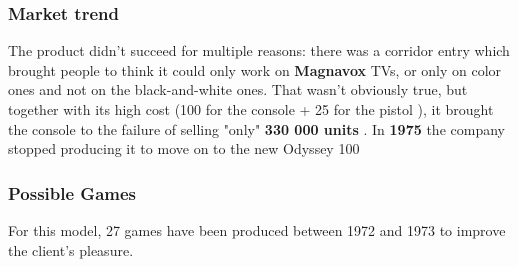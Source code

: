 \documentclass[a4paper,10pt]{book}
\begin{document}
 \subsubsection{Market trend }
 The product didn't succeed for multiple reasons: there was a corridor entry which brought people to think it could
          only work on  \textbf{Magnavox }  TVs, or only on color ones and not on the black-and-white ones.
          That wasn't obviously true, but together with its high cost (100  for the console + 25  for the  pistol ),
          it brought the console to the failure of selling "only"  \textbf{330 000 units } .  
          In  \textbf{1975 }  the company stopped producing it to move on to the new  
            Odyssey 100 
 \subsubsection{Possible Games }
 
          For this model, 27 games have been produced between 1972 and 1973 to improve the client's pleasure.
         
\end{document}
